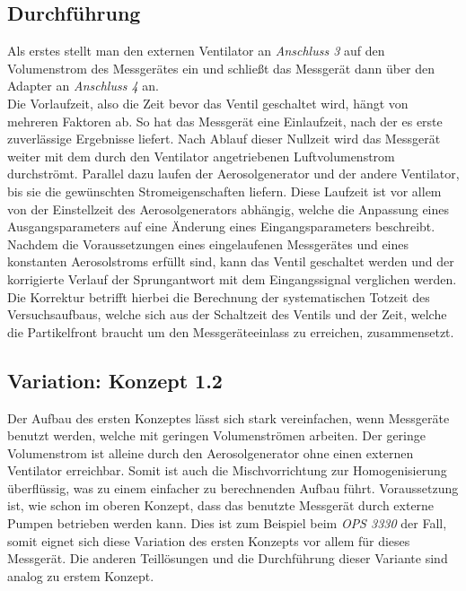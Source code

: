 \subsection{Durchf\"{u}hrung}
Als erstes stellt man den externen Ventilator an \textit{Anschluss 3} auf den Volumenstrom des Messger\"{a}tes ein und schlie{\ss}t das Messger\"{a}t dann \"{u}ber den Adapter an \textit{Anschluss 4} an.\\
Die Vorlaufzeit, also die Zeit bevor das Ventil geschaltet wird, h\"{a}ngt von mehreren Faktoren ab. So hat das Messger\"{a}t eine Einlaufzeit, nach der es erste zuverl\"{a}ssige Ergebnisse liefert. Nach Ablauf dieser Nullzeit wird das Messger\"{a}t weiter mit dem durch den Ventilator angetriebenen Luftvolumenstrom durchstr\"{o}mt. Parallel dazu laufen der Aerosolgenerator und der andere Ventilator, bis sie die gew\"{u}nschten Stromeigenschaften liefern. Diese Laufzeit ist vor allem von der Einstellzeit des Aerosolgenerators abh\"{a}ngig, welche die Anpassung eines Ausgangsparameters auf eine \"{A}nderung eines Eingangsparameters beschreibt. Nachdem die Voraussetzungen eines eingelaufenen Messger\"{a}tes und eines konstanten Aerosolstroms erf\"{u}llt sind, kann das Ventil geschaltet werden und der korrigierte Verlauf der Sprungantwort mit dem Eingangssignal verglichen werden. Die Korrektur betrifft hierbei die Berechnung der systematischen Totzeit des Versuchsaufbaus, welche sich aus der Schaltzeit des Ventils und der Zeit, welche die Partikelfront braucht um den Messger\"{a}teeinlass zu erreichen, zusammensetzt.

\subsection{Variation: Konzept 1.2}
Der Aufbau des ersten Konzeptes l\"{a}sst sich stark vereinfachen, wenn Messger\"{a}te benutzt werden, welche mit geringen Volumenstr\"{o}men arbeiten. Der geringe Volumenstrom ist alleine durch den Aerosolgenerator ohne einen externen Ventilator erreichbar. Somit ist auch die Mischvorrichtung zur Homogenisierung \"{u}berfl\"{u}ssig, was zu einem einfacher zu berechnenden Aufbau f\"{u}hrt. Voraussetzung ist, wie schon im oberen Konzept, dass das benutzte Messger\"{a}t durch externe Pumpen betrieben werden kann. Dies ist zum Beispiel beim \textit{OPS 3330} der Fall, somit eignet sich diese Variation des ersten Konzepts vor allem f\"{u}r dieses Messger\"{a}t. Die anderen Teill\"{o}sungen und die Durchf\"{u}hrung dieser Variante sind analog zu erstem Konzept.

